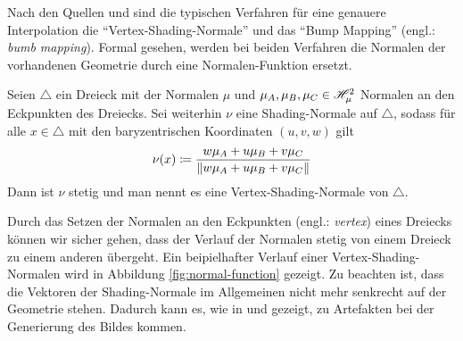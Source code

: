 		Nach den Quellen \cite[S.~166,~584~ff]{pbrt3} und \cite[S.~38~ff,~183~ff]{real-time-render} sind die typischen Verfahren für eine genauere Interpolation die \enquote{Vertex-Shading-Normale} und das \enquote{Bump Mapping} (engl.: \textit{bumb mapping}).
		Formal gesehen, werden bei beiden Verfahren die Normalen der vorhandenen Geometrie durch eine Normalen-Funktion ersetzt.
		\begin{definition}
			Seien $\triangle$ ein Dreieck mit der Normalen $\mu$ und $\mu_A, \mu_B, \mu_C \in \mathscr{H}^{2}_{\mu}$ Normalen an den Eckpunkten des Dreiecks.
			Sei weiterhin $\nu$ eine Shading-Normale auf $\triangle$, sodass für alle $x\in \triangle$ mit den baryzentrischen Koordinaten $(u,v,w)$ gilt
			\[
				\nu(x) \coloneqq \frac{w\mu_A + u\mu_B + v\mu_C}{\left\| w\mu_A + u\mu_B + v\mu_C \right\|}
			\]
			Dann ist $\nu$ stetig und man nennt es eine Vertex-Shading-Normale von $\triangle$.
		\end{definition}

		Durch das Setzen der Normalen an den Eckpunkten (engl.: \textit{vertex}) eines Dreiecks können wir sicher gehen, dass der Verlauf der Normalen stetig von einem Dreieck zu einem anderen übergeht.
		Ein beipielhafter Verlauf einer Vertex-Shading-Normalen wird in Abbildung \ref{fig:normal-function} gezeigt.
		Zu beachten ist, dass die Vektoren der Shading-Normale im Allgemeinen nicht mehr senkrecht auf der Geometrie stehen.
		Dadurch kann es, wie in \cite[S.~574~ff]{pbrt3} und \cite[S.~150~ff]{veach-thesis} gezeigt, zu Artefakten bei der Generierung des Bildes kommen.

